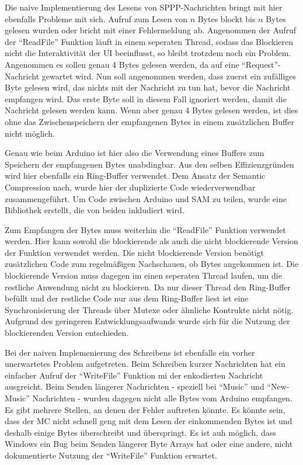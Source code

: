 Die naive Implementierung des Lesens von \ac{SPPP}-Nachrichten bringt mit hier ebenfalls Probleme mit sich.
Aufruf zum Lesen von $n$ Bytes blockt bis $n$ Bytes gelesen wurden oder bricht mit einer Fehlermeldung ab.
Angenommen der Aufruf der \enquote{ReadFile} Funktion läuft in einem seperaten Thread, sodass das Blockieren nicht die Interaktivität der \ac{UI} beeinflusst, so bleibt trotzdem noch ein Problem.
Angenommen es sollen genau 4 Bytes gelesen werden, da auf eine \enquote{Request}-Nachricht gewartet wird.
Nun soll angenommen werden, dass zuerst ein zufälliges Byte gelesen wird, das nichts mit der Nachricht zu tun hat, bevor die Nachricht empfangen wird.
Das erste Byte soll in diesem Fall ignoriert werden, damit die Nachricht gelesen werden kann.
Wenn aber genau 4 Bytes gelesen werden, ist dies ohne das Zwischenspeichern der empfangenen Bytes in einem zusätzlichen Buffer nicht möglich.

Genau wie beim Arduino ist hier also die Verwendung eines Buffers zum Speichern der empfangenen Bytes unabdingbar.
Aus den selben Effizienzgründen wird hier ebenfalls ein Ring-Buffer verwendet.
Dem Ansatz der Semantic Compression nach, wurde hier der duplizierte Code wiederverwendbar zusammengeführt.
Um Code zwischen Arduino und \ac{SAM} zu teilen, wurde eine Bibliothek erstellt, die von beiden inkludiert wird.

Zum Empfangen der Bytes muss weiterhin die \enquote{ReadFile} Funktion verwendet werden.
Hier kann sowohl die blockierende als auch die nicht blockierende Version der Funktion verwendet werden.
Die nicht blockierende Version benötigt zusätzlichen Code zum regelmäßigen Nachschauen, ob Bytes angekommen ist.
Die blockierende Version muss dagegen im einen seperaten Thread laufen, um die restliche Anwendung nicht zu blockieren.
Da nur dieser Thread den Ring-Buffer befüllt und der restliche Code nur aus dem Ring-Buffer liest ist eine Synchronisierung der Threads über Mutexe oder ähnliche Kontrukte nicht nötig.
Aufgrund des geringeren Entwicklungsaufwands wurde sich für die Nutzung der blockierenden Version entschieden.

Bei der naiven Implemenierung des Schreibens ist ebenfalls ein vorher unerwartetes Problem aufgetreten.
Beim Schreiben kurzer Nachrichten hat ein einfacher Aufruf der \enquote{WriteFile} Funktion mi der enkodierten Nachricht ausgreicht.
Beim Senden längerer Nachrichten - speziell bei \enquote{Music} und \enquote{New-Music} Nachrichten - wurden dagegen nicht alle Bytes vom Arduino empfangen.
Es gibt mehrere Stellen, an denen der Fehler auftreten könnte.
Es könnte sein, dass der \ac{MC} nicht schnell geng mit dem Lesen der einkommenden Bytes ist und deshalb einige Bytes überschreibt und überspringt.
Es ist auh möglich, dass Windows ein Bug beim Senden längerer Byte Arrays hat oder eine andere, nicht dokumentierte Nutzung der \enquote{WriteFile} Funktion erwartet.

